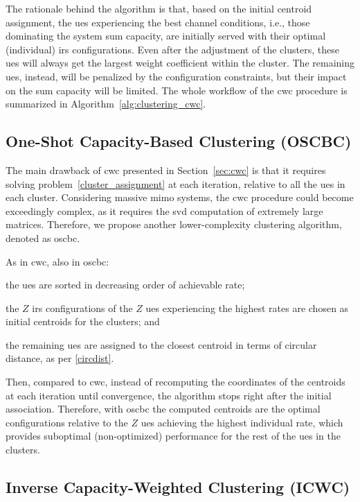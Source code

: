 The rationale behind the algorithm is that, based on the initial centroid assignment, the \glspl{ue} experiencing the best channel conditions, i.e., those dominating the system sum capacity, are initially served with their optimal (individual) \gls{irs} configurations. 
Even after the adjustment of the clusters, these \glspl{ue} will always get the largest weight coefficient within the cluster. The remaining \glspl{ue}, instead, will be penalized by the configuration constraints, but their impact on the sum capacity will be limited.
The whole workflow of the \gls{cwc} procedure is summarized in Algorithm~\ref{alg:clustering_cwc}.

\subsection{One-Shot Capacity-Based Clustering (OSCBC)}
\label{sec:clust_oscbc}
The main drawback of \gls{cwc} presented in Section~\ref{sec:cwc} is that it requires solving problem~\eqref{cluster_assignment} at each iteration, relative to all the \glspl{ue} in each cluster. 
Considering massive \gls{mimo} systems, the \gls{cwc} procedure could become exceedingly complex, as it requires the \gls{svd} computation of extremely large matrices.
Therefore, we propose another lower-complexity clustering algorithm, denoted as \gls{oscbc}.

As in \gls{cwc}, also in \gls{oscbc}:
\begin{enumerate*}[label=(\textit{\roman*})]
\item the \glspl{ue} are sorted in decreasing order of achievable rate; \item the $Z$ \gls{irs} configurations of the $Z$ \glspl{ue} experiencing the highest rates are chosen as initial centroids for the clusters; and \item  the remaining \glspl{ue} are assigned to the closest centroid in terms of circular distance, as per \eqref{circdist}. 
\end{enumerate*}
Then, compared to \gls{cwc}, instead of recomputing the coordinates of the centroids at each iteration until convergence, the algorithm stops right after the initial association.
Therefore, with \gls{oscbc} the computed centroids are the optimal configurations relative to the $Z$ \glspl{ue} achieving the highest individual rate, which provides suboptimal (non-optimized) performance for the rest of the \glspl{ue} in the clusters.

\subsection{Inverse Capacity-Weighted Clustering (ICWC)}
\label{sec:icwc}

